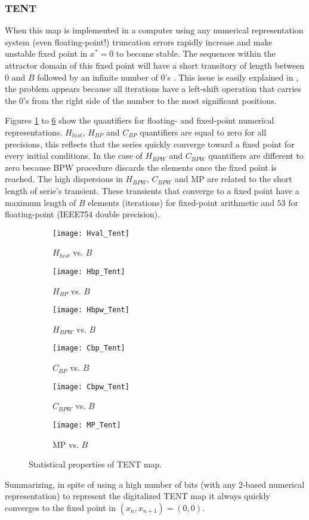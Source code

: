 \subsubsection{TENT} \label{sssec:tent}

When this map is implemented in a computer using any numerical representation system (even floating-point!) truncation errors rapidly increase and make unstable fixed point in $x^*=0$ to become stable.
The sequences within the attractor domain of this fixed point will have a short transitory of length between $0$ and $B$ followed by an infinite number of $0$'s \cite{Jessa2002,Callegari}.
This issue is easily explained in \cite{Li2004}, the problem appears because all iterations have a left-shift operation that carries the $0$'s from the right side of the number to the most significant positions.

Figures \ref{fig:Hval_Tent} to \ref{fig:MP_Tent} show the quantifiers for floating- and fixed-point numerical representations.
$H_{hist}$, $H_{BP}$ and $C_{BP}$ quantifiers are equal to zero for all precisions, this reflects that the series quickly converge toward a fixed point for every initial conditions.
In the case of $H_{BPW}$ and $C_{BPW}$ quantifiers are different to zero because BPW procedure discards the elements once the fixed point is reached.
The high dispersions in $H_{BPW}$, $C_{BPW}$ and MP are related to the short length of serie's transient.
These transients that converge to a fixed point have a maximum length of $B$ elements (iterations) for fixed-point arithmetic and $53$ for floating-point (IEEE754 double precision).
%
\begin{figure}[H]
	\centering
	\begin{subfigure}[b]{0.49\textwidth}
		\texttt{[image: Hval\_Tent]}
		\caption{$H_{hist}$ vs. $B$}
		\label{fig:Hval_Tent}
	\end{subfigure}
	\begin{subfigure}[b]{0.49\textwidth}
		\texttt{[image: Hbp\_Tent]}
		\caption{$H_{BP}$ vs. $B$}
		\label{fig:Hbp_Tent}
	\end{subfigure}
	\begin{subfigure}[b]{0.49\textwidth}
		\texttt{[image: Hbpw\_Tent]}
		\caption{$H_{BPW}$ vs. $B$}
		\label{fig:Hbpw_Tent}
	\end{subfigure}
	\begin{subfigure}[b]{0.49\textwidth}
		\texttt{[image: Cbp\_Tent]}
		\caption{$C_{BP}$ vs. $B$}
		\label{fig:Cbp_Tent}
	\end{subfigure}
	\begin{subfigure}[b]{0.49\textwidth}
		\texttt{[image: Cbpw\_Tent]}
		\caption{$C_{BPW}$ vs. $B$}
		\label{fig:Cbpw_Tent}
	\end{subfigure}
	\begin{subfigure}[b]{0.49\textwidth}
		\texttt{[image: MP\_Tent]}
		\caption{MP vs. $B$}
		\label{fig:MP_Tent}
	\end{subfigure}
	\caption{Statistical properties of TENT map.}
	\label{fig:TENT_QuantiB}
\end{figure}

Summarizing, in spite of using a high number of bits (with any 2-based numerical representation) to represent the digitalized TENT map it always quickly converges to the fixed point in $(x_n, x_{n+1})=(0, 0)$.
